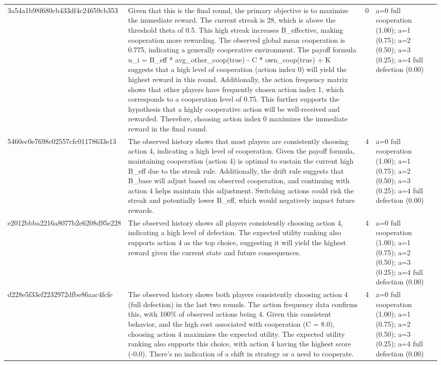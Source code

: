 \begin{tabular}{lp{8cm}ll l}
3a54a1b98f680cb433df4c24659cb353 & Given that this is the final round, the primary objective is to maximize the immediate reward. The current streak is 28, which is above the threshold theta of 0.5. This high streak increases B\_effective, making cooperation more rewarding. The observed global mean cooperation is 0.775, indicating a generally cooperative environment. The payoff formula u\_i = B\_eff * avg\_other\_coop(true) - C * own\_coop(true) + K suggests that a high level of cooperation (action index 0) will yield the highest reward in this round. Additionally, the action frequency matrix shows that other players have frequently chosen action index 1, which corresponds to a cooperation level of 0.75. This further supports the hypothesis that a highly cooperative action will be well-received and rewarded. Therefore, choosing action index 0 maximizes the immediate reward in the final round. & 0 & a=0 full cooperation (1.00); a=1 (0.75); a=2 (0.50); a=3 (0.25); a=4 full defection (0.00) &  \\
5460ec0e7698c02557cfc01178633e13 & The observed history shows that most players are consistently choosing action 4, indicating a high level of cooperation. Given the payoff formula, maintaining cooperation (action 4) is optimal to sustain the current high B\_eff due to the streak rule. Additionally, the drift rule suggests that B\_base will adjust based on observed cooperation, and continuing with action 4 helps maintain this adjustment. Switching actions could risk the streak and potentially lower B\_eff, which would negatively impact future rewards. & 4 & a=0 full cooperation (1.00); a=1 (0.75); a=2 (0.50); a=3 (0.25); a=4 full defection (0.00) &  \\
e2012bbba2216a8077b2e6208d95e228 & The observed history shows all players consistently choosing action 4, indicating a high level of defection. The expected utility ranking also supports action 4 as the top choice, suggesting it will yield the highest reward given the current state and future consequences. & 4 & a=0 full cooperation (1.00); a=1 (0.75); a=2 (0.50); a=3 (0.25); a=4 full defection (0.00) &  \\
d228e5f33ef2232972dfbe86aac4fcfe & The observed history shows both players consistently choosing action 4 (full defection) in the last two rounds. The action frequency data confirms this, with 100\% of observed actions being 4. Given this consistent behavior, and the high cost associated with cooperation (C = 8.0), choosing action 4 maximizes the expected utility. The expected utility ranking also supports this choice, with action 4 having the highest score (-0.0). There's no indication of a shift in strategy or a need to cooperate. & 4 & a=0 full cooperation (1.00); a=1 (0.75); a=2 (0.50); a=3 (0.25); a=4 full defection (0.00) &  \\

\end{tabular}
